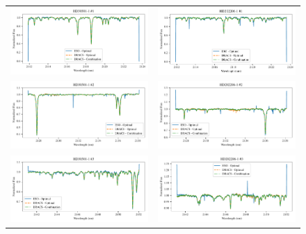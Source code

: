 \begin{figure}
    \begin{tabular}{cc}
        \includegraphics[width=0.5\linewidth]{figures/reduction/pipeline_compare/pipeline_compare_HD30501-1_chip_1} & \includegraphics[width=0.5\linewidth]{figures/reduction/pipeline_compare/pipeline_compare_HD202206-1_chip_1}\\
        \includegraphics[width=0.5\linewidth]{figures/reduction/pipeline_compare/pipeline_compare_HD30501-1_chip_2} & \includegraphics[width=0.5\linewidth]{figures/reduction/pipeline_compare/pipeline_compare_HD202206-1_chip_2}\\
        \includegraphics[width=0.5\linewidth]{figures/reduction/pipeline_compare/pipeline_compare_HD30501-1_chip_3} & \includegraphics[width=0.5\linewidth]{figures/reduction/pipeline_compare/pipeline_compare_HD202206-1_chip_3}\\

\end{tabular}
\end{figure}
